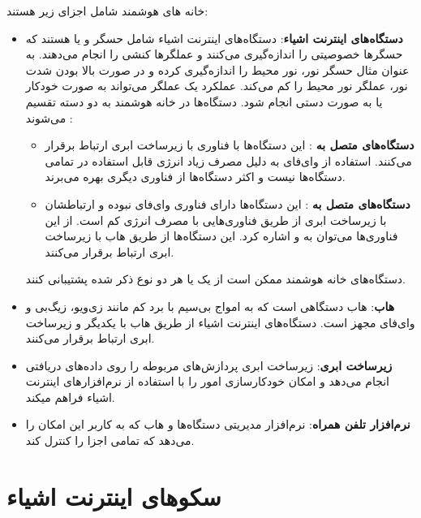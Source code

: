 خانه های هوشمند شامل اجزای زیر هستند:

\begin{itemize}
\item \textbf{دستگاه‌های اینترنت اشیاء}: دستگاه‌های اینترنت اشیاء شامل حسگر و یا  هستند که حسگرها خصوصیتی را اندازه‌گیری می‌کنند و عملگرها کنشی را انجام می‌دهند. به عنوان مثال حسگر نور، نور محیط را اندازه‌گیری کرده و در صورت بالا بودن شدت نور، عملگر نور محیط را کم می‌کند. عملکرد یک عملگر می‌تواند به صورت خودکار یا به صورت دستی انجام شود.
دستگاه‌ها در خانه‌ هوشمند به دو دسته تقسیم می‌شوند \cite{x252}:
\begin{itemize}
\item \textbf{دستگاه‌های متصل به }: این دستگاه‌ها با فناوری  با زیرساخت ابری ارتباط برقرار می‌کنند. استفاده از وای‌فای به دلیل مصرف زیاد انرژی قابل استفاده در تمامی دستگاه‌ها نیست و اکثر دستگاه‌ها از فناوری دیگری بهره می‌برند.
\item \textbf{دستگاه‌های متصل به }: این دستگاه‌ها دارای فناوری وای‌فای نبوده و ارتباطشان با زیرساخت ابری از طریق فناوری‌هایی با مصرف انرژی کم است. از این فناوری‌ها می‌توان به  و  اشاره کرد. این دستگاه‌ها از طریق هاب با زیرساخت ابری ارتباط برقرار می‌کنند.
\end{itemize}

دستگاه‌های خانه هوشمند ممکن است از یک یا هر دو نوع ذکر شده پشتیبانی کنند.

\item \textbf{هاب}: هاب دستگاهی است که به امواج بی‌سیم با برد کم مانند زی‌ویو، زیگ‌بی و وای‌فای مجهز است. دستگاه‌های اینترنت اشیاء از طریق هاب با یکدیگر و زیرساخت ابری ارتباط برقرار می‌کنند.
\item \textbf{زیرساخت ابری}: زیرساخت ابری پردازش‌های مربوطه را روی داده‌های دریافتی انجام می‌دهد و امکان خودکارسازی امور را با استفاده از نرم‌افزارهای اینترنت اشیاء فراهم میکند.
\item \textbf{نرم‌افزار تلفن همراه}: نرم‌افزار مدیریتی دستگاه‌ها و هاب که به کاربر این امکان را می‌دهد که تمامی اجزا را کنترل کند.

\end{itemize}

\section{سکوهای اینترنت اشیاء‌}

